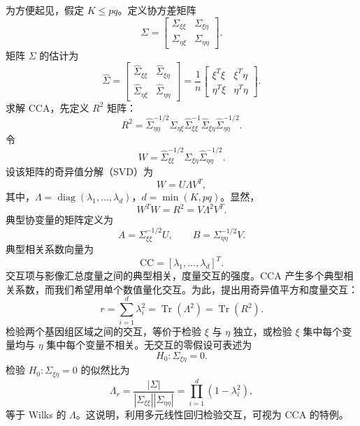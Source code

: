 为方便起见，假定 $K\leq pq$。定义协方差矩阵
\[
\Sigma=\begin{bmatrix}\Sigma_{\xi\xi}&\Sigma_{\xi\eta}\\\Sigma_{\eta\xi}&\Sigma_{\eta\eta}\end{bmatrix}.
\]
矩阵 $\Sigma$ 的估计为
\begin{equation}
\widehat\Sigma=\begin{bmatrix}\widehat\Sigma_{\xi\xi}&\widehat\Sigma_{\xi\eta}\\\widehat\Sigma_{\eta\xi}&\widehat\Sigma_{\eta\eta}\end{bmatrix}
=\frac1n\begin{bmatrix}\xi^T\xi&\xi^T\eta\\\eta^T\xi&\eta^T\eta\end{bmatrix}.
\tag{6.195}
\end{equation}
求解 CCA，先定义 $R^2$ 矩阵：
\begin{equation}
R^2=\widehat\Sigma_{\eta\eta}^{-1/2}\widehat\Sigma_{\eta\xi}\widehat\Sigma_{\xi\xi}^{-1}\widehat\Sigma_{\xi\eta}\widehat\Sigma_{\eta\eta}^{-1/2}.
\tag{6.196}
\end{equation}
令
\begin{equation}
W=\widehat\Sigma_{\xi\xi}^{-1/2}\widehat\Sigma_{\xi\eta}\widehat\Sigma_{\eta\eta}^{-1/2}.
\tag{6.197}
\end{equation}
设该矩阵的奇异值分解（SVD）为
\begin{equation}
W=U\Lambda V^T,
\tag{6.198}
\end{equation}
其中，$\Lambda=\operatorname{diag}(\lambda_1,\ldots,\lambda_d)$，$d=\min(K,pq)$。显然，
\begin{equation}
W^TW=R^2=V\Lambda^2V^T.
\tag{6.199}
\end{equation}
典型协变量的矩阵定义为
\begin{equation}
A=\Sigma_{\xi\xi}^{-1/2}U,\qquad B=\Sigma_{\eta\eta}^{-1/2}V.
\tag{6.200}
\end{equation}
典型相关系数向量为
\begin{equation}
\mathrm{CC}=[\lambda_1,\ldots,\lambda_d]^T.
\tag{6.201}
\end{equation}
交互项与影像汇总度量之间的典型相关，度量交互的强度。CCA 产生多个典型相关系数，而我们希望用单个数值量化交互。为此，提出用奇异值平方和度量交互：
\begin{equation}
r=\sum_{i=1}^d\lambda_i^2=\operatorname{Tr}(\Lambda^2)=\operatorname{Tr}(R^2).
\tag{6.202}
\end{equation}
检验两个基因组区域之间的交互，等价于检验 $\xi$ 与 $\eta$ 独立，或检验 $\xi$ 集中每个变量均与 $\eta$ 集中每个变量不相关。无交互的零假设可表述为
\[
H_0:\Sigma_{\xi\eta}=0.
\]
检验 $H_0:\Sigma_{\xi\eta}=0$ 的似然比为
\begin{equation}
\Lambda_r=\frac{|\Sigma|}{|\Sigma_{\xi\xi}||\Sigma_{\eta\eta}|}=\prod_{i=1}^d(1-\lambda_i^2),
\tag{6.203}
\end{equation}
等于 Wilks 的 $\Lambda$。这说明，利用多元线性回归检验交互，可视为 CCA 的特例。

